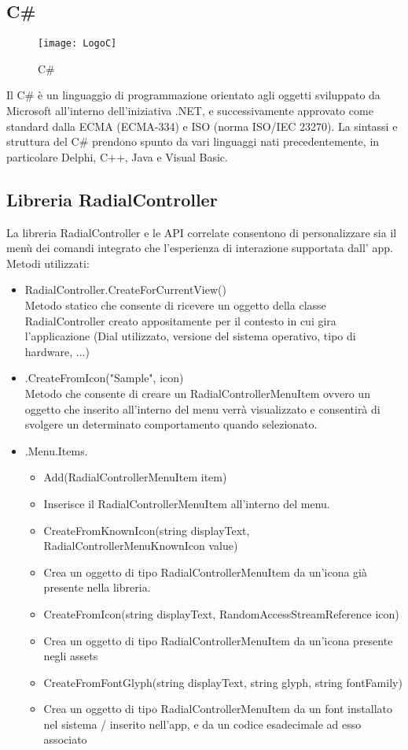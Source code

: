 \subsection{C\#}
\begin{figure}[htpb!]
\center
  \texttt{[image: LogoC]}
  \caption{C\#}
\end{figure}
Il C\# è un linguaggio di programmazione orientato agli oggetti sviluppato da Microsoft all'interno dell'iniziativa .NET, e successivamente approvato come standard dalla ECMA (ECMA-334) e ISO (norma ISO/IEC 23270).
La sintassi e struttura del C\# prendono spunto da vari linguaggi nati precedentemente, in particolare Delphi, C++, Java e Visual Basic.
\subsection{Libreria RadialController}
La libreria RadialController e le API correlate consentono di personalizzare sia il menù dei comandi integrato che l'esperienza di interazione supportata dall’ app.
Metodi utilizzati:
\begin{itemize}


\item RadialController.CreateForCurrentView()\\
Metodo statico che consente di ricevere un oggetto della classe RadialController creato appositamente per il contesto in cui gira l’applicazione (Dial utilizzato, versione del sistema operativo, tipo di hardware, ...)
\item .CreateFromIcon("Sample", icon)\\
Metodo che consente di creare un RadialControllerMenuItem ovvero un oggetto che inserito all’interno del menu verrà visualizzato e consentirà di svolgere un determinato comportamento quando selezionato.
\item .Menu.Items.
\begin{itemize}
\item Add(RadialControllerMenuItem item)
\item Inserisce il RadialControllerMenuItem all’interno del menu.
\item CreateFromKnownIcon(string displayText, RadialControllerMenuKnownIcon value)
\item Crea un oggetto di tipo RadialControllerMenuItem da un’icona già presente nella libreria.
\item CreateFromIcon(string displayText, RandomAccessStreamReference icon)
\item Crea un oggetto di tipo RadialControllerMenuItem da un’icona presente negli assets
\item CreateFromFontGlyph(string displayText, string glyph, string fontFamily)
\item Crea un oggetto di tipo RadialControllerMenuItem da un font installato nel sistema / inserito nell’app, e da un codice esadecimale ad esso associato
\end{itemize}
\end{itemize}
